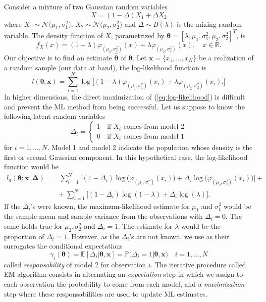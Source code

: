 Consider a mixture of two Gaussian random variables
\[X = (1-\Delta)X_1 + \Delta X_2 \] where $X_1 \sim \mathcal{N}\big(\mu_1,\sigma^2_1\big)$, $X_2 \sim \mathcal{N}\big(\mu_2,\sigma^2_2\big)$ and $\Delta \sim B(\lambda)$ is the mixing random variable. The density function of $X$, parametrized by $\bm{\theta} = [\lambda,\mu_1,\sigma^2_1,\mu_2,\sigma^2_2]^T$, is
\[f_X(x) = (1-\lambda)\varphi_{(\mu_1,\sigma^2_1)}(x)+\lambda \varphi_{(\mu_2,\sigma^2_2)}(x), \quad x \in \mathbb{R}. \] Our objective is to find an estimate $\widehat{\bm{\theta}}$ of $\bm{\theta}$. Let $\bm{x} = \{x_1,\ldots,x_N\}$ be a realization of a random sample (our data at hand), the log-likelihood function is
\begin{equation}\label{eq:log-likelihood}
l(\bm{\theta};\bm{x}) = \sum_{i=1}^{N}\log\big[(1-\lambda)\varphi_{(\mu_1,\sigma^2_1)}(x_i)+\lambda\varphi_{(\mu_2,\sigma^2_2)}(x_i). \big]
\end{equation}
In higher dimensions, the direct maximization of (\ref{eq:log-likelihood}) is difficult and prevent the ML method from being successful. Let us suppose to know the following latent random variables
\[ \Delta_i = 
\begin{cases*}
1 \quad  \text{if $X_i$ comes from model 2}\\
0 \quad \text{if $X_i$ comes from model 1}
\end{cases*}
\]
for $i = 1,\ldots,N$. Model 1 and model 2 indicate the population whose density is the first or second Gaussian component. In this hypothetical case, the log-likelihood function would be 
\begin{align*}
l_0(\bm{\theta};\bm{x},\bm{\Delta}) & = \sum_{i=1}^{N}\big[(1-\Delta_i)\log\big(\varphi_{(\mu_1,\sigma^2_1)}(x_i)\big)+\Delta_i\log\big(\varphi_{(\mu_2,\sigma^2_2)}(x_i)\big)\big]+\\
& \quad + \sum_{i=1}^{N}\big[(1-\Delta_i)\log(1-\lambda)+\Delta_i \log(\lambda) \big].
\end{align*}
If the $\Delta_i$'s were known, the maximum-likelihood estimate for $\mu_1$ and $\sigma^2_1$ would be the sample mean and sample variance from the observations with $\Delta_i = 0$. The same holds true for $\mu_2,\sigma^2_2$ and $\Delta_i=1$. The estimate for $\lambda$ would be the proportion of $\Delta_i = 1$. However, as the 
$\Delta_i$'s are not known, we use as their surrogates the conditional expectations \[ \gamma_i(\bm{\theta}) = \mathbb{E}[\Delta_i \lvert \bm{\theta},\bm{x}]= \mathbb{P}\big(\Delta_i= 1 \lvert\bm{\theta},\bm{x} \big) \quad i = 1,\ldots,N \] called \textit{responsability} of model 2 for observation $i$. The iterative procedure called EM algorithm consists in alternating an \textit{expectation} step in which we assign to each observation the probability to come from each model, and a \textit{maximization} step where these responsabilities are used to update ML estimates.
